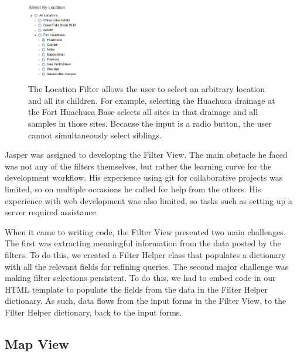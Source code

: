 \documentclass[10pt,draftclsnofoot,onecolumn]{IEEEtran}
\begin{document}
\begin{figure}[h]
\centering
\includegraphics[width=0.25\textwidth]{images/location_filter.png}
\captionsetup{justification=centering}
\caption{
  The Location Filter allows the user to select an arbitrary location and all its children.
  For example, selecting the Huachuca drainage at the Fort Huachuca Base selects all sites in that drainage and all samples in those sites.
  Because the input is a radio button, the user cannot simultaneously select siblings.
}
\label{fig:location_filter}
\end{figure}

Jasper was assigned to developing the Filter View.
The main obstacle he faced was not any of the filters themselves, but rather the learning curve for the development workflow.
His experience using git for collaborative projects was limited, so on multiple occasions he called for help from the others.
His experience with web development was also limited, so tasks such as setting up a server required assistance.

When it came to writing code, the Filter View presented two main challenges.
The first was extracting meaningful information from the data posted by the filters.
To do this, we created a Filter Helper class that populates a dictionary with all the relevant fields for refining queries.
The second major challenge was making filter selections persistent.
To do this, we had to embed code in our HTML template to populate the fields from the data in the Filter Helper dictionary.
As such, data flows from the input forms in the Filter View, to the Filter Helper dictionary, back to the input forms.

\subsection{Map View} %
\end{document}
